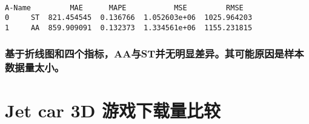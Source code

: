 \documentclass[11pt]{article}
\begin{document}
    \begin{center}
    \end{center}
    { \hspace*{\fill} \\}
    
    \begin{Verbatim}[commandchars=\\\{\}]
  A-Name         MAE      MAPE           MSE         RMSE
0     ST  821.454545  0.136766  1.052603e+06  1025.964203
1     AA  859.909091  0.132373  1.334561e+06  1155.231815

    \end{Verbatim}

    \subsubsection{基于折线图和四个指标，AA与ST并无明显差异。其可能原因是样本数据量太小。}\label{ux57faux4e8eux6298ux7ebfux56feux548cux56dbux4e2aux6307ux6807aaux4e0estux5e76ux65e0ux660eux663eux5deeux5f02ux5176ux53efux80fdux539fux56e0ux662fux6837ux672cux6570ux636eux91cfux592aux5c0f}

    \section{Jet car 3D
游戏下载量比较}\label{jet-car-3d-ux6e38ux620fux4e0bux8f7dux91cfux6bd4ux8f83}
\end{document}
